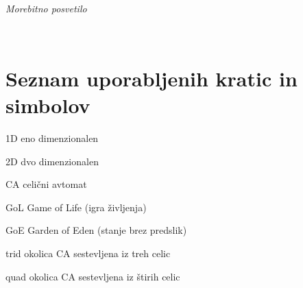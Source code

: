 \documentclass[12pt,a4paper,openany]{book}
\newcommand{\abbrlabel}[1]{\makebox[3cm][l]{\textbf{#1}\ \dotfill}}
\newenvironment{abbreviations}{\begin{list}{}{\renewcommand{\makelabel}{\abbrlabel}}}{\end{list}}
\begin{document}
\ \thispagestyle{empty}

\newpage


\thispagestyle{empty}

$\;$ 

\vspace{5cm}
\hfill {\Large \em Morebitno posvetilo}
\thispagestyle{empty}

\newpage



\ \thispagestyle{empty}

\newpage


\renewcommand\thepage{} 
\tableofcontents 
\renewcommand\thepage{\arabic{page}}

\thispagestyle{empty}



\chapter*{Seznam uporabljenih kratic in simbolov}

\thispagestyle{empty}


\begin{abbreviations}
\item[1D] eno dimenzionalen
\item[2D] dvo dimenzionalen
\item[CA] celični avtomat
\item[GoL] Game of Life (igra življenja)
\item[GoE] Garden of Eden (stanje brez predslik)
\item[trid] okolica CA sestevljena iz treh celic
\item[quad] okolica CA sestevljena iz štirih celic
\end{abbreviations}


\clearpage{\pagestyle{empty}\cleardoublepage}

\end{document}
